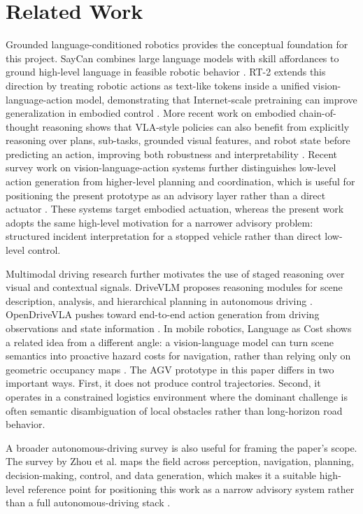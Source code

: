 \documentclass[conference]{IEEEtran}
\begin{document}
\section{Related Work}
Grounded language-conditioned robotics provides the conceptual foundation for this project. SayCan combines large language models with skill affordances to ground high-level language in feasible robotic behavior \cite{ahn2022saycan}. RT-2 extends this direction by treating robotic actions as text-like tokens inside a unified vision-language-action model, demonstrating that Internet-scale pretraining can improve generalization in embodied control \cite{brohan2023rt2}. More recent work on embodied chain-of-thought reasoning shows that VLA-style policies can also benefit from explicitly reasoning over plans, sub-tasks, grounded visual features, and robot state before predicting an action, improving both robustness and interpretability \cite{zawalski2025ecot}. Recent survey work on vision-language-action systems further distinguishes low-level action generation from higher-level planning and coordination, which is useful for positioning the present prototype as an advisory layer rather than a direct actuator \cite{ma2024vlasurvey}. These systems target embodied actuation, whereas the present work adopts the same high-level motivation for a narrower advisory problem: structured incident interpretation for a stopped vehicle rather than direct low-level control.

Multimodal driving research further motivates the use of staged reasoning over visual and contextual signals. DriveVLM proposes reasoning modules for scene description, analysis, and hierarchical planning in autonomous driving \cite{tian2024drivevlm}. OpenDriveVLA pushes toward end-to-end action generation from driving observations and state information \cite{zhou2025opendrivevla}. In mobile robotics, Language as Cost shows a related idea from a different angle: a vision-language model can turn scene semantics into proactive hazard costs for navigation, rather than relying only on geometric occupancy maps \cite{oh2025languagecost}. The AGV prototype in this paper differs in two important ways. First, it does not produce control trajectories. Second, it operates in a constrained logistics environment where the dominant challenge is often semantic disambiguation of local obstacles rather than long-horizon road behavior.

A broader autonomous-driving survey is also useful for framing the paper's scope. The survey by Zhou et al. maps the field across perception, navigation, planning, decision-making, control, and data generation, which makes it a suitable high-level reference point for positioning this work as a narrow advisory system rather than a full autonomous-driving stack \cite{zhou2023survey}.
\end{document}
